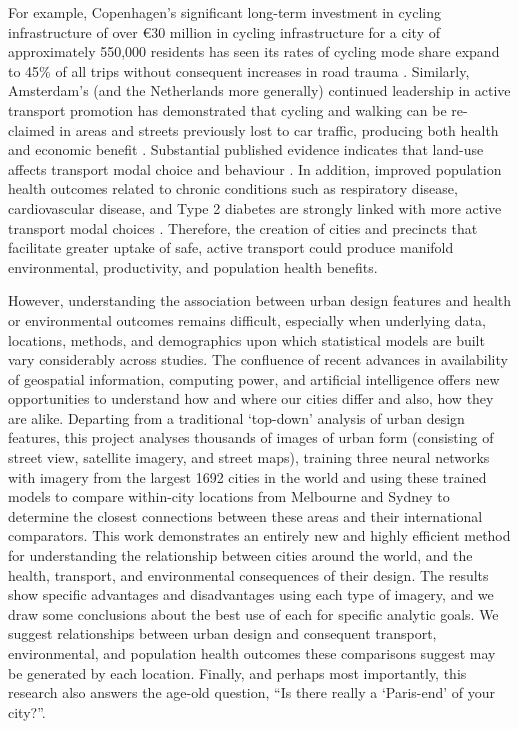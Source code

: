 \documentclass[sageh,times]{sagej}
\begin{document}
For example, Copenhagen's significant long-term investment in cycling infrastructure of over \euro 30 million in cycling infrastructure for a city of approximately 550,000 residents has seen its rates of cycling mode share expand to 45\% of all trips without consequent increases in road trauma \citep{Kaplan2014}. Similarly, Amsterdam's (and the Netherlands more generally) continued leadership in active transport promotion has demonstrated that cycling and walking can be re-claimed in areas and streets previously lost to car traffic, producing both health and economic benefit \citep{Andersen2000}. Substantial published evidence indicates that land-use affects transport modal choice and behaviour  \citep{Giles-corti2016,Kleinert2016,Goenka2016}. In addition, improved population health outcomes related to chronic conditions such as respiratory disease, cardiovascular disease, and Type 2 diabetes are strongly linked with more active transport modal choices  \citep{Zapata-Diomedi2017}. Therefore, the creation of cities and precincts that facilitate greater uptake of safe, active transport could produce manifold environmental, productivity, and population health benefits. 

However, understanding the association between urban design features and health or environmental outcomes remains difficult, especially when underlying data, locations, methods, and demographics upon which statistical models are built vary considerably across studies. The confluence of recent advances in availability of geospatial information, computing power, and artificial intelligence offers new opportunities to understand how and where our cities differ and also, how they are alike. Departing from a traditional `top-down' analysis of urban design features, this project analyses thousands of images of urban form (consisting of street view, satellite imagery, and street maps), training three neural networks with imagery from the largest 1692 cities in the world and using these trained models to compare within-city locations from Melbourne and Sydney to determine the closest connections between these areas and their international comparators. This work demonstrates an entirely new and highly efficient method for understanding the relationship between cities around the world, and the health, transport, and environmental consequences of their design. The results show specific advantages and disadvantages using each type of imagery, and we draw some conclusions about the best use of each for specific analytic goals. We suggest relationships between urban design and consequent transport, environmental, and population health outcomes these comparisons suggest may be generated by each location. Finally, and perhaps most importantly, this research also answers the age-old question, ``Is there really a `Paris-end' of your city?''.
\end{document}
